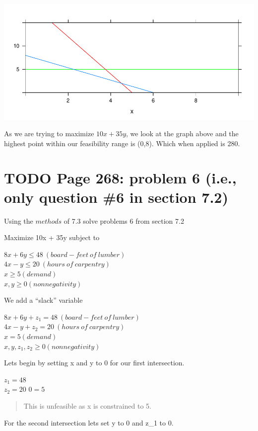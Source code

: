 \documentclass[]{article}
\begin{document}
\includegraphics{Christophe_Hunt_hw6_files/figure-latex/unnamed-chunk-3-1.pdf}

As we are trying to maximize \(10x + 35y\), we look at the graph above
and the highest point within our feasibility range is (0,8). Which when
applied is 280.

\section{TODO Page 268: problem 6 (i.e., only question \#6 in section
7.2)}\label{todo-page-268-problem-6-i.e.-only-question-6-in-section-7.2}

Using the \(methods\) of 7.3 solve problems 6 from section 7.2

Maximize 10x + 35y subject to

\(8x + 6y \leq 48 ~(board-feet~of~lumber)\)\\
\(4x - y \leq 20 ~ (hours~of~carpentry)\)\\
\(x \geq 5 (demand)\)\\
\(x,y \geq 0 (nonnegativity)\)

We add a ``slack'' variable

\(8x + 6y + z_1 = 48 ~(board-feet~of~lumber)\)\\
\(4x - y + z_2 = 20 ~ (hours~of~carpentry)\)\\
\(x = 5 (demand)\)\\
\(x,y, z_1, z_2 \geq 0 (nonnegativity)\)

Lets begin by setting x and y to 0 for our first intersection.

\(z_1 = 48\)\\
\(z_2 = 20\) \(0 = 5\)

\begin{quote}
This is unfeasible as x is constrained to 5.
\end{quote}

For the second intersection lets set y to 0 and z\_1 to 0.
\end{document}
